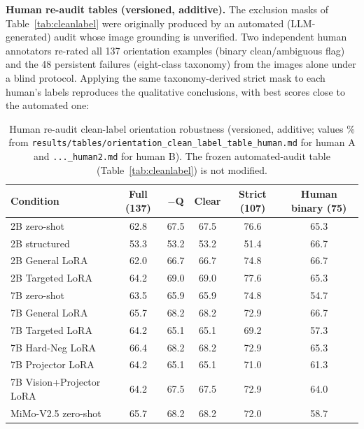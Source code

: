 \textbf{Human re-audit tables (versioned, additive).} The exclusion masks of
Table~\ref{tab:cleanlabel} were originally produced by an automated
(LLM-generated) audit whose image grounding is unverified. Two independent
human annotators re-rated all 137 orientation examples (binary
clean/ambiguous flag) and the 48 persistent failures (eight-class taxonomy)
from the images alone under a blind protocol. Applying the same
taxonomy-derived strict mask to each human's labels reproduces the
qualitative conclusions, with best scores close to the automated one:

\begin{table}[h]
\centering
\footnotesize
\caption{Human re-audit clean-label orientation robustness (versioned,
additive; values \% from
\texttt{results/tables/orientation\_clean\_label\_table\_human.md} for
human A and \texttt{...\_human2.md} for human B).
The frozen automated-audit table (Table~\ref{tab:cleanlabel}) is not
modified.}
\label{tab:cleanlabel-human}
\begin{tabular}{lccccc}
\toprule
Condition & Full (137) & $-$Q & Clear & Strict (107) & Human binary (75) \\
\midrule
2B zero-shot & 62.8 & 67.5 & 67.5 & 76.6 & 65.3 \\
2B structured & 53.3 & 53.2 & 53.2 & 51.4 & 66.7 \\
2B General LoRA & 62.0 & 66.7 & 66.7 & 74.8 & 66.7 \\
2B Targeted LoRA & 64.2 & 69.0 & 69.0 & 77.6 & 65.3 \\
7B zero-shot & 63.5 & 65.9 & 65.9 & 74.8 & 54.7 \\
7B General LoRA & 65.7 & 68.2 & 68.2 & 72.9 & 66.7 \\
7B Targeted LoRA & 64.2 & 65.1 & 65.1 & 69.2 & 57.3 \\
7B Hard-Neg LoRA & 66.4 & 68.2 & 68.2 & 72.9 & 65.3 \\
7B Projector LoRA & 64.2 & 65.1 & 65.1 & 71.0 & 61.3 \\
7B Vision+Projector LoRA & 64.2 & 67.5 & 67.5 & 72.9 & 64.0 \\
MiMo-V2.5 zero-shot & 65.7 & 68.2 & 68.2 & 72.0 & 58.7 \\
\bottomrule
\end{tabular}
\end{table}

